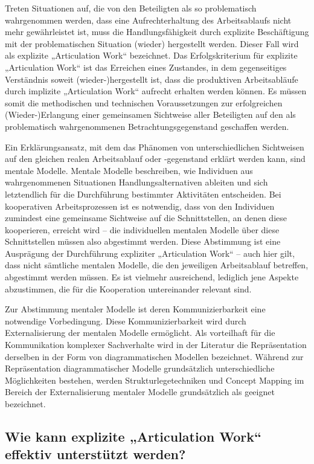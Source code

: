 Treten Situationen auf, die von den Beteiligten als so problematisch wahrgenommen werden, dass eine Aufrechterhaltung des Arbeitsablaufs nicht mehr gewährleistet ist, muss die Handlungsfähigkeit durch explizite Beschäftigung mit der problematischen Situation (wieder) hergestellt werden. Dieser Fall wird als explizite „Articulation Work“ bezeichnet. Das Erfolgskriterium für explizite „Articulation Work“ ist das Erreichen eines Zustandes, in dem gegenseitiges Verständnis soweit (wieder-)hergestellt ist, dass die produktiven Arbeitsabläufe durch implizite „Articulation Work“ aufrecht erhalten werden können. Es müssen somit die methodischen und technischen Voraussetzungen zur erfolgreichen (Wieder-)Erlangung einer gemeinsamen Sichtweise aller Beteiligten auf den als problematisch wahrgenommenen Betrachtungsgegenstand geschaffen werden.

Ein Erklärungsansatz, mit dem das Phänomen von unterschiedlichen Sichtweisen auf den gleichen realen Arbeitsablauf oder -gegenstand erklärt werden kann, sind mentale Modelle. Mentale Modelle beschreiben, wie Individuen aus wahrgenommenen Situationen Handlungsalternativen ableiten und sich letztendlich für die Durchführung bestimmter Aktivitäten entscheiden. Bei kooperativen Arbeitsprozessen ist es notwendig, dass von den Individuen zumindest eine gemeinsame Sichtweise auf die Schnittstellen, an denen diese kooperieren, erreicht wird -- die individuellen mentalen Modelle über diese Schnittstellen müssen also abgestimmt werden. Diese Abstimmung ist eine Ausprägung der Durchführung expliziter „Articulation Work“ -- auch hier gilt, dass nicht sämtliche mentalen Modelle, die den jeweiligen Arbeitsablauf betreffen, abgestimmt werden müssen. Es ist vielmehr ausreichend, lediglich jene Aspekte abzustimmen, die für die Kooperation untereinander relevant sind.

Zur Abstimmung mentaler Modelle ist deren Kommunizierbarkeit eine notwendige Vorbedingung. Diese Kommunizierbarkeit wird durch Externalisierung der mentalen Modelle ermöglicht. Als vorteilhaft für die Kommunikation komplexer Sachverhalte wird in der Literatur die Repräsentation derselben in der Form von diagrammatischen Modellen bezeichnet. Während zur Repräsentation diagrammatischer Modelle grundsätzlich unterschiedliche Möglichkeiten bestehen, werden Strukturlegetechniken und Concept Mapping im Bereich der Externalisierung mentaler Modelle grundsätzlich als geeignet bezeichnet. 

\subsection{Wie kann explizite „Articulation Work“ effektiv unterstützt werden?}

